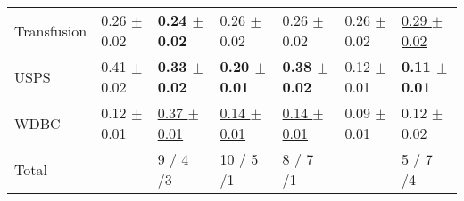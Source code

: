 \begin{table}[ht]
\begin{tabular}{lllllll}
  Transfusion & 0.26 $\pm$ 0.02 & \textbf{0.24 $\pm$ 0.02} & 0.26 $\pm$ 0.02 & 0.26 $\pm$ 0.02 & 0.26 $\pm$ 0.02 & \underline{0.29 $\pm$ 0.02} \\ 
  USPS & 0.41 $\pm$ 0.02 & \textbf{0.33 $\pm$ 0.02} & \textbf{0.20 $\pm$ 0.01} & \textbf{0.38 $\pm$ 0.02} & 0.12 $\pm$ 0.01 & \textbf{0.11 $\pm$ 0.01} \\ 
  WDBC & 0.12 $\pm$ 0.01 & \underline{0.37 $\pm$ 0.01} & \underline{0.14 $\pm$ 0.01} & \underline{0.14 $\pm$ 0.01} & 0.09 $\pm$ 0.01 & 0.12 $\pm$ 0.02 \\ 
   \hline
Total &  & 9 / 4 /3 & 10 / 5 /1 & 8 / 7 /1 &  & 5 / 7 /4 \\ 
   \hline
\end{tabular}
\end{table}
